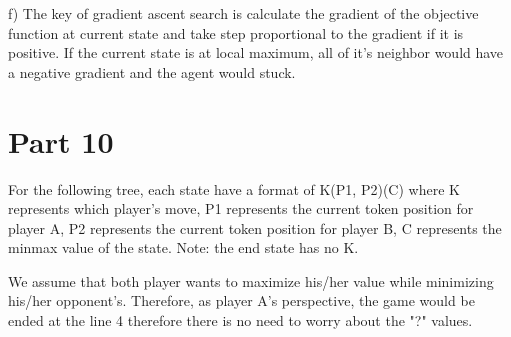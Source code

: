 \documentclass{article}
\begin{document}
f) The key of gradient ascent search is calculate the gradient of the objective function at current state and take step proportional to the gradient if it is positive. If the current state is at local maximum, all of it's neighbor would have a negative gradient and the agent would stuck.

\section*{Part 10}

For the following tree, each state have a format of K(P1, P2)(C) where K represents which player's move, P1 represents the current token position for player A, P2 represents the current token position for player B, C represents the minmax value of the state. Note: the end state has no K.


\vspace{5mm}
\hspace{5mm}
We assume that both player wants to maximize his/her value while minimizing his/her opponent's. Therefore, as player A's perspective, the game would be ended at the line 4 therefore there is no need to worry about the "?" values.
\end{document}
